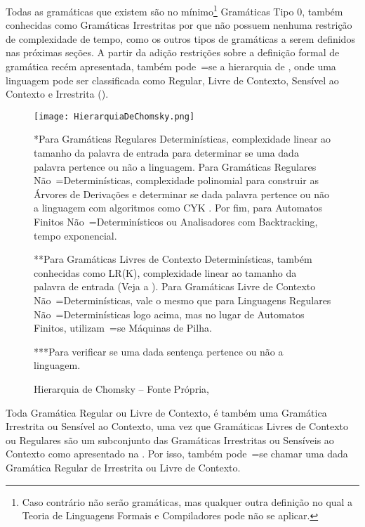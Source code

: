 Todas as gramáticas que existem são no mínimo\footnote{
Caso contrário não serão gramáticas,
mas qualquer outra definição no qual a Teoria de Linguagens Formais e
Compiladores pode não se aplicar.
}
Gramáticas Tipo 0,
também conhecidas como Gramáticas Irrestritas por que não possuem nenhuma restrição de complexidade de tempo,
como os outros tipos de gramáticas a serem definidos nas próximas seções{}.
A partir da adição restrições sobre a definição formal de gramática recém apresentada,
também pode~=se  a hierarquia de ,
onde uma linguagem pode ser classificada como Regular,
Livre de Contexto,
Sensível ao Contexto e
Irrestrita ().
\begin{figure}[h]
\centering
\texttt{[image: HierarquiaDeChomsky.png]}
\begin{minipage}{\textwidth} \footnotesize
*Para Gramáticas Regulares Determinísticas,
complexidade linear ao tamanho da palavra de entrada para determinar se uma dada palavra pertence ou
não a linguagem.
Para Gramáticas Regulares Não~=Determinísticas,
complexidade polinomial para construir as Árvores de Derivações e
determinar se dada palavra pertence ou
não a linguagem com algoritmos como CYK \cite{hopcroftBook,cykParsingAlgorithm}.
Por fim,
para Automatos Finitos Não~=Determinísticos ou
Analisadores com Backtracking,
tempo exponencial.

**Para Gramáticas Livres de Contexto Determinísticas,
também conhecidas como LR(K),
complexidade linear ao tamanho da palavra de entrada (Veja a ).
Para Gramáticas Livre de Contexto Não~=Determinísticas,
vale o mesmo que para Linguagens Regulares Não~=Determinísticas logo acima,
mas no lugar de Automatos Finitos,
utilizam~=se Máquinas de Pilha.

***Para verificar se uma dada sentença pertence ou não a linguagem.
\end{minipage}
\caption[Hierarquia de Chomsky]{Hierarquia de Chomsky -- Fonte Própria\protect\footnotemark,
}
\label{HierarquiaDeChomsky}
\end{figure}

Toda Gramática Regular ou
Livre de Contexto,
é também uma Gramática Irrestrita ou
Sensível ao Contexto,
uma vez que Gramáticas Livres de Contexto ou
Regulares são um subconjunto das Gramáticas Irrestritas ou
Sensíveis ao Contexto como apresentado na .
Por isso,
também pode~=se chamar uma dada Gramática Regular de Irrestrita ou
Livre de Contexto.

